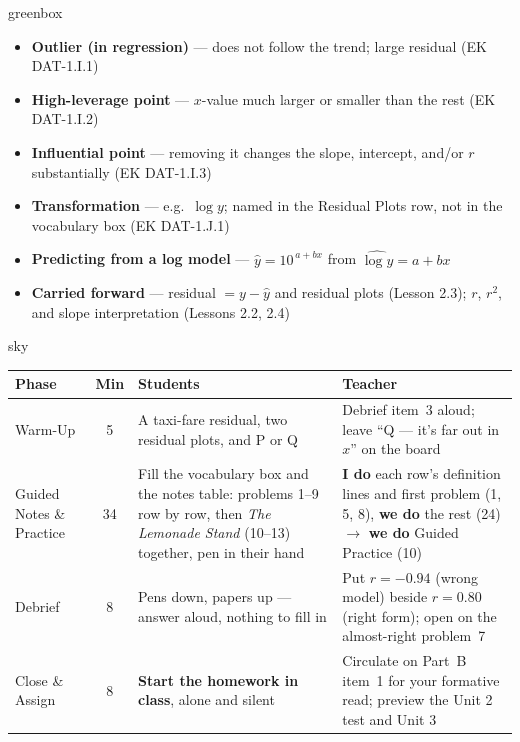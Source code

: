 \documentclass[10pt]{article}
\begin{document}
\boxguard
\begin{skillbox}{greenbox}
\begin{minipage}[t]{0.48\linewidth}
    \begin{itemize}
        \item \textbf{Outlier (in regression)} --- does not follow the trend; large residual
              (EK DAT-1.I.1)
        \item \textbf{High-leverage point} --- $x$-value much larger or smaller than the rest
              (EK DAT-1.I.2)
        \item \textbf{Influential point} --- removing it changes the slope, intercept, and/or
              $r$ substantially (EK DAT-1.I.3)
    \end{itemize}
\end{minipage}
\hfill
\begin{minipage}[t]{0.48\linewidth}
    \begin{itemize}
        \item \textbf{Transformation} --- e.g.\ $\log y$; named in the Residual Plots row, not
              in the vocabulary box (EK DAT-1.J.1)
        \item \textbf{Predicting from a log model} --- $\hat{y} = 10^{\,a + bx}$ from
              $\widehat{\log y} = a + bx$
        \item \textbf{Carried forward} --- residual $= y - \hat{y}$ and residual plots
              (Lesson 2.3); $r$, $r^2$, and slope interpretation (Lessons 2.2, 2.4)
    \end{itemize}
\end{minipage}
\end{skillbox}

\boxguard[30]
\begin{skillbox}{sky}
\renewcommand{\arraystretch}{1.25}
\begin{tabularx}{\linewidth}{@{}l c X X@{}}
\textbf{Phase} & \textbf{Min} & \textbf{Students} & \textbf{Teacher} \\
\hline
Warm-Up & 5 & A taxi-fare residual, two residual plots, and P or Q & Debrief item~3 aloud;
leave ``Q --- it's far out in $x$'' on the board \\
Guided Notes \& Practice & 34 & Fill the vocabulary box and the notes table: problems 1--9 row
by row, then \emph{The Lemonade Stand} (10--13) together, pen in their hand & \textbf{I do}
each row's definition lines and first problem (1, 5, 8), \textbf{we do} the rest (24)
$\to$ \textbf{we do} Guided Practice (10) \\
Debrief & 8 & Pens down, papers up --- answer aloud, nothing to fill in & Put $r = -0.94$
(wrong model) beside $r = 0.80$ (right form); open on the almost-right problem~7 \\
Close \& Assign & 8 & \textbf{Start the homework in class}, alone and silent & Circulate on
Part~B item~1 for your formative read; preview the Unit 2 test and Unit 3 \\
\end{tabularx}
\end{skillbox}
\end{document}
